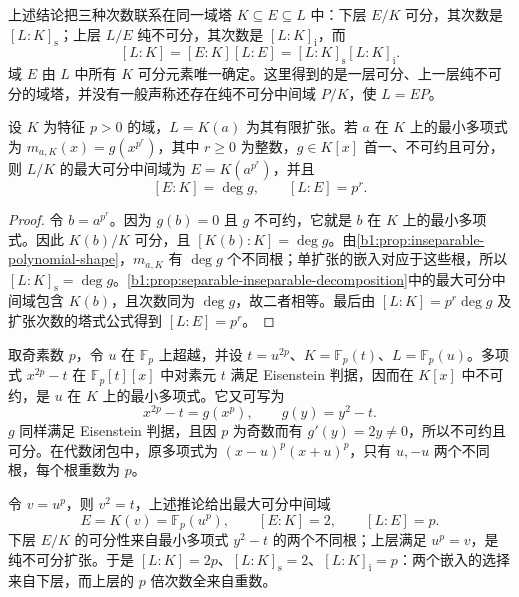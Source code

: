 上述结论把三种次数联系在同一域塔 \(K\subseteq E\subseteq L\) 中：下层 \(E/K\) 可分，其次数是 \([L:K]_{\mathrm s}\)；上层 \(L/E\) 纯不可分，其次数是 \([L:K]_{\mathrm i}\)，而
\[
	[L:K]=[E:K][L:E]=[L:K]_{\mathrm s}[L:K]_{\mathrm i}.
\]
域 \(E\) 由 \(L\) 中所有 \(K\) 可分元素唯一确定。这里得到的是一层可分、上一层纯不可分的域塔，并没有一般声称还存在纯不可分中间域 \(P/K\)，使 \(L=EP\)。

\begin{corollary}\label{b1:cor:simple-extension-separable-part}
	设 \(K\) 为特征 \(p>0\) 的域，\(L=K(a)\) 为其有限扩张。若 \(a\) 在 \(K\) 上的最小多项式为 \(m_{a,K}(x)=g(x^{p^r})\)，其中 \(r\geq0\) 为整数，\(g\in K[x]\) 首一、不可约且可分，则 \(L/K\) 的最大可分中间域为 \(E=K(a^{p^r})\)，并且
	\[
		[E:K]=\deg g,\qquad [L:E]=p^r.
	\]
\end{corollary}
\begin{proof}
	令 \(b=a^{p^r}\)。因为 \(g(b)=0\) 且 \(g\) 不可约，它就是 \(b\) 在 \(K\) 上的最小多项式。因此 \(K(b)/K\) 可分，且 \([K(b):K]=\deg g\)。由\cref{b1:prop:inseparable-polynomial-shape}，\(m_{a,K}\) 有 \(\deg g\) 个不同根；单扩张的嵌入对应于这些根，所以 \([L:K]_{\mathrm s}=\deg g\)。\cref{b1:prop:separable-inseparable-decomposition}中的最大可分中间域包含 \(K(b)\)，且次数同为 \(\deg g\)，故二者相等。最后由 \([L:K]=p^r\deg g\) 及扩张次数的塔式公式得到 \([L:E]=p^r\)。
\end{proof}

取奇素数 \(p\)，令 \(u\) 在 \(\mathbb F_p\) 上超越，并设 \(t=u^{2p}\)、\(K=\mathbb F_p(t)\)、\(L=\mathbb F_p(u)\)。多项式 \(x^{2p}-t\) 在 \(\mathbb F_p[t][x]\) 中对素元 \(t\) 满足 Eisenstein 判据，因而在 \(K[x]\) 中不可约，是 \(u\) 在 \(K\) 上的最小多项式。它又可写为
\[
	x^{2p}-t=g(x^p),\qquad g(y)=y^2-t.
\]
\(g\) 同样满足 Eisenstein 判据，且因 \(p\) 为奇数而有 \(g'(y)=2y\neq0\)，所以不可约且可分。在代数闭包中，原多项式为 \((x-u)^p(x+u)^p\)，只有 \(u,-u\) 两个不同根，每个根重数为 \(p\)。

\ProseParagraphBreak

令 \(v=u^p\)，则 \(v^2=t\)，上述推论给出最大可分中间域
\[
	E=K(v)=\mathbb F_p(u^p),\qquad [E:K]=2,\qquad [L:E]=p.
\]
下层 \(E/K\) 的可分性来自最小多项式 \(y^2-t\) 的两个不同根；上层满足 \(u^p=v\)，是纯不可分扩张。于是 \([L:K]=2p\)、\([L:K]_{\mathrm s}=2\)、\([L:K]_{\mathrm i}=p\)：两个嵌入的选择来自下层，而上层的 \(p\) 倍次数全来自重数。
